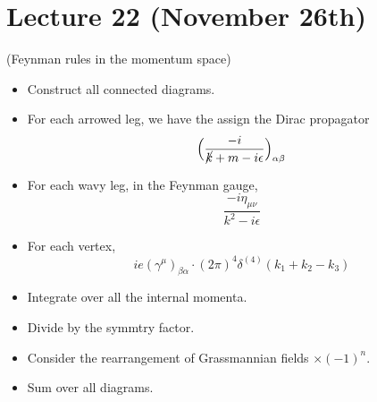 \section{Lecture 22 (November 26th)}
\begin{prop}
(Feynman rules in the momentum space) 
\begin{itemize}
\item[(i)] Construct all connected diagrams.
\item[(ii)] For each arrowed leg, we have the assign the Dirac propagator
\[\Big(\dfrac{-i}{\cancel{k}+m-i\epsilon }\Big)_{\alpha \beta }\]
\item[(iii)] For each wavy leg, in the Feynman gauge,
\[\dfrac{-i\eta _{\mu \nu }}{k^2-i\epsilon }\]
\item[(iv)] For each vertex, 
\[ie(\gamma ^{\mu })_{\beta \alpha }\cdot (2\pi )^{4}\delta ^{(4)}(k_1+k_2-k_3)\]
\item[(v)] Integrate over all the internal momenta.
\item[(vi)] Divide by the symmtry factor.
\item[(vii)] Consider the rearrangement of Grassmannian fields $\times (-1)^{n}$.
\item[(viii)] Sum over all diagrams.
\end{itemize}
\end{prop}
\vspace{2ex}
